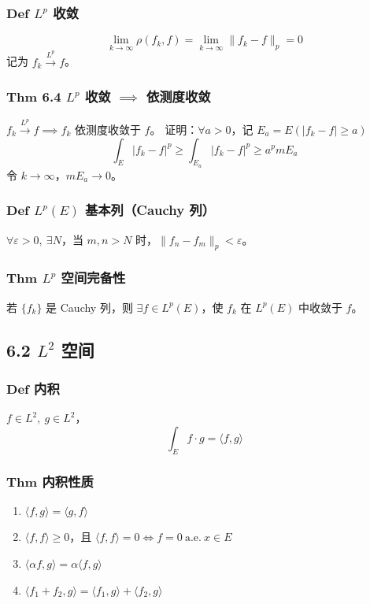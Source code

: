 \documentclass{article}
\begin{document}
	\subsubsection{$\bm{Def}$ $L^p$ 收敛}
	\[
	\lim_{k\to\infty}\rho(f_k,f) = \lim_{k\to\infty}\|f_k-f\|_p = 0
	\]
	记为 $f_k \xrightarrow{L^p} f$。
	
	\subsubsection{$\bm{Thm}$ 6.4 $L^p$ 收敛 $\implies$ 依测度收敛}
	$f_k \xrightarrow{L^p} f \implies f_k$ 依测度收敛于 $f$。
	证明：$\forall a>0$，记 $E_a = E(|f_k-f|\ge a)$
	\[
	\int_E |f_k-f|^p \ge \int_{E_a} |f_k-f|^p \ge a^p mE_a
	\]
	令 $k\to\infty$，$mE_a\to0$。
	
	\subsubsection{$\bm{Def}$ $L^p(E)$ 基本列（Cauchy 列）}
	$\forall \varepsilon>0,\ \exists N$，当 $m,n>N$ 时，$\|f_n-f_m\|_p<\varepsilon$。
	
	\subsubsection{$\bm{Thm}$ $L^p$ 空间完备性}
	若 $\{f_k\}$ 是 Cauchy 列，则 $\exists f\in L^p(E)$，使 $f_k$ 在 $L^p(E)$ 中收敛于 $f$。
	
	\subsection{6.2 $L^2$ 空间}
	\subsubsection{$\bm{Def}$ 内积}
	$f\in L^2,\ g\in L^2$，
	\[
	\int_E f\cdot g = \langle f,g\rangle
	\]
	
	\subsubsection{$\bm{Thm}$ 内积性质}
	\begin{enumerate}
		\item $\langle f,g\rangle = \langle g,f\rangle$
		\item $\langle f,f\rangle \ge 0$，且 $\langle f,f\rangle=0 \iff f=0\ \text{a.e.}\ x\in E$
		\item $\langle \alpha f,g\rangle = \alpha\langle f,g\rangle$
		\item $\langle f_1+f_2,g\rangle = \langle f_1,g\rangle+\langle f_2,g\rangle$
	\end{enumerate}
	
\end{document}
